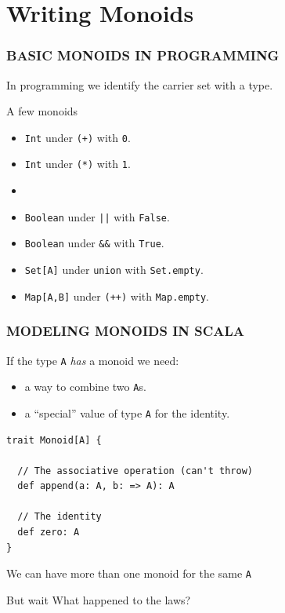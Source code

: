 \documentclass{beamer}
\begin{document}
\section{Writing Monoids}

\begin{frame}\frametitle{BASIC MONOIDS IN PROGRAMMING}
  In programming we identify the carrier set with a type.

  \begin{block}{A few monoids}
  \begin{itemize}
    \item<1-> \texttt{Int} under \texttt{(+)} with \texttt{0}.
    \item<1-> \texttt{Int} under \texttt{(*)} with \texttt{1}.
    \item{}
    \item<3-> \texttt{Boolean} under \texttt{||} with \texttt{False}.
    \item<3-> \texttt{Boolean} under \texttt{\&\&} with \texttt{True}.
    \item<3-> \texttt{Set[A]} under \texttt{union} with \texttt{Set.empty}.
    \item<3-> \texttt{Map[A,B]} under \texttt{(++)} with \texttt{Map.empty}.
  \end{itemize}
  \end{block}

  \end{frame}

\begin{frame}[fragile]\frametitle{MODELING MONOIDS IN SCALA}
  If the type \texttt{A} \emph{has} a monoid we need:
  \begin{itemize}
    \item a way to combine two \texttt{A}s.
    \item a ``special'' value of type \texttt{A} for the identity.
  \end{itemize}
  \pause

  \begin{block}{}
  \begin{lstlisting}
trait Monoid[A] {

  // The associative operation (can't throw)
  def append(a: A, b: => A): A

  // The identity
  def zero: A
}
  \end{lstlisting}
  \end{block}

  We can have more than one monoid for the same \texttt{A}
  \begin{block}{But wait}
    What happened to the laws?
  \end{block}
\end{frame}
\end{document}
